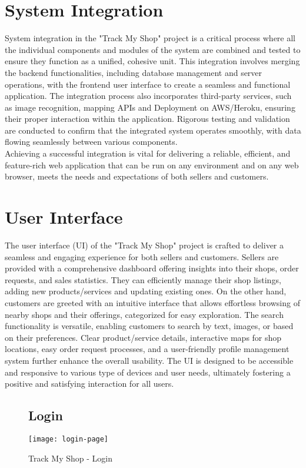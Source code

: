 \section{System Integration}
System integration in the "Track My Shop" project is a critical process where all the individual components and modules of the system are combined and tested to ensure they function as a unified, cohesive unit. This integration involves merging the backend functionalities, including database management and server operations, with the frontend user interface to create a seamless and functional application. The integration process also incorporates third-party services, such as image recognition, mapping APIs and Deployment on AWS/Heroku, ensuring their proper interaction within the application. Rigorous testing and validation are conducted to confirm that the integrated system operates smoothly, with data flowing seamlessly between various components.\\
Achieving a successful integration is vital for delivering a reliable, efficient, and feature-rich web application that can be run on any environment and on any web browser, meets the needs and expectations of both sellers and customers. 

\section{User Interface}
The user interface (UI) of the "Track My Shop" project is crafted to deliver a seamless and engaging experience for both sellers and customers. Sellers are provided with a comprehensive dashboard offering insights into their shops, order requests, and sales statistics. They can efficiently manage their shop listings, adding new products/services and updating existing ones. On the other hand, customers are greeted with an intuitive interface that allows effortless browsing of nearby shops and their offerings, categorized for easy exploration. The search functionality is versatile, enabling customers to search by text, images, or based on their preferences. Clear product/service details, interactive maps for shop locations, easy order request processes, and a user-friendly profile management system further enhance the overall usability. The UI is designed to be accessible and responsive to various type of devices and user needs, ultimately fostering a positive and satisfying interaction for all users.
\newpage

\begin{figure}[h]
	\subsection{Login}
	\centering
	\texttt{[image: login-page]}
	\caption{Track My Shop - Login}
\end{figure}

